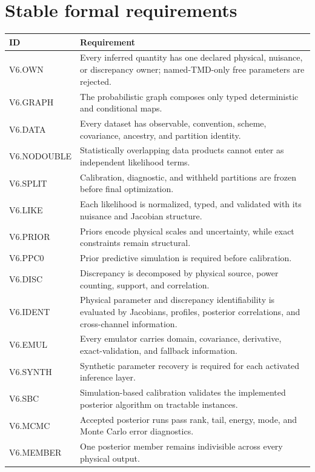 \documentclass[11pt]{article}
\begin{document}
\appendix

\section{Stable formal requirements}
\label{app:requirements}

\begin{longtable}{L{0.16\textwidth}L{0.74\textwidth}}
\toprule
ID & Requirement\\
\midrule
\endhead
V6.OWN &
Every inferred quantity has one declared physical, nuisance, or discrepancy
owner; named-TMD-only free parameters are rejected.\\
V6.GRAPH &
The probabilistic graph composes only typed deterministic and conditional maps.\\
V6.DATA &
Every dataset has observable, convention, scheme, covariance, ancestry, and
partition identity.\\
V6.NODOUBLE &
Statistically overlapping data products cannot enter as independent
likelihood terms.\\
V6.SPLIT &
Calibration, diagnostic, and withheld partitions are frozen before final
optimization.\\
V6.LIKE &
Each likelihood is normalized, typed, and validated with its nuisance and
Jacobian structure.\\
V6.PRIOR &
Priors encode physical scales and uncertainty, while exact constraints remain
structural.\\
V6.PPC0 &
Prior predictive simulation is required before calibration.\\
V6.DISC &
Discrepancy is decomposed by physical source, power counting, support, and
correlation.\\
V6.IDENT &
Physical parameter and discrepancy identifiability is evaluated by Jacobians,
profiles, posterior correlations, and cross-channel information.\\
V6.EMUL &
Every emulator carries domain, covariance, derivative, exact-validation, and
fallback information.\\
V6.SYNTH &
Synthetic parameter recovery is required for each activated inference layer.\\
V6.SBC &
Simulation-based calibration validates the implemented posterior algorithm on
tractable instances.\\
V6.MCMC &
Accepted posterior runs pass rank, tail, energy, mode, and Monte Carlo error
diagnostics.\\
V6.MEMBER &
One posterior member remains indivisible across every physical output.\\

\end{longtable}
\end{document}
